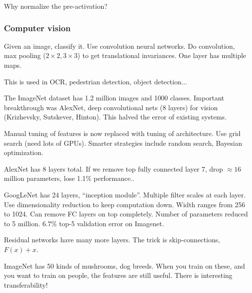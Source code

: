 Why normalize the pre-activation? 


%

\subsubsection{Computer vision}

Given an image, classify it. Use convolution neural networks. Do convolution, max pooling ($2\times2, 3\times 3$) to get translational invariances. One layer has multiple maps.

This is used in OCR, pedestrian detection, object detection...

The ImageNet dataset has 1.2 million images and 1000 classes. Important breakthrough was AlexNet, deep convolutional nets (8 layers) for vision (Krizhevsky, Sutskever, Hinton). This halved the error of existing systems.

Manual tuning of features is now replaced with tuning of architecture. 
Use grid search (need lots of GPUs). Smarter strategies include random search, Bayesian optimization.

AlexNet has 8 layers total.
%
If we remove top fully connected layer 7, drop $\approx 16$ million parameters, lose 1.1$\%$ performance..

GoogLeNet has 24 layers, ``inception module''. Multiple filter scales at each layer. Use dimensionality reduction to keep computation down.
Width ranges from 256 to 1024. Can remove FC layers on top completely. Number of parameters reduced to 5 million. $6.7\%$ top-5 validation error on Imagenet.


Residual networks have many more layers. The trick is skip-connections, $F(x)+x$.

ImageNet has 50 kinds of mushrooms, dog breeds. When you train on these, and you want to train on people, the features are still useful.  There is interesting transferability! %

